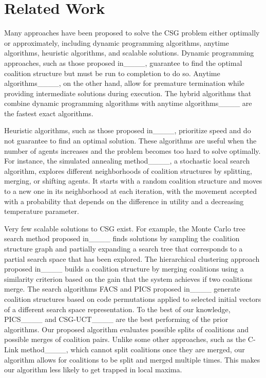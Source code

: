 \section{Related Work}
Many approaches have been proposed to solve the CSG problem either optimally or approximately, including dynamic programming algorithms, anytime algorithms, heuristic algorithms, and scalable solutions. 
Dynamic programming approaches, such as those proposed in____, guarantee to find the optimal coalition structure but must be run to completion to do so. 
Anytime algorithms____, on the other hand, allow for premature termination while providing intermediate solutions during execution. 
The hybrid algorithms that combine dynamic programming algorithms with anytime algorithms____  are the fastest exact algorithms. 

Heuristic algorithms, such as those proposed in____, prioritize speed and do not guarantee to find an optimal solution. These algorithms are useful when the number of agents increases and the problem becomes too hard to solve optimally. For instance, the simulated annealing method____, a stochastic local search algorithm, explores different neighborhoods of coalition structures by splitting, merging, or shifting agents. It starts with a random coalition structure and moves to a new one in its neighborhood at each iteration, with the movement accepted with a probability that depends on the difference in utility and a decreasing temperature parameter. 

Very few scalable solutions to CSG exist. For example, the Monte Carlo tree search method proposed in____ finds solutions by sampling the coalition structure graph and partially expanding a search tree that corresponds to a partial search space that has been explored. The hierarchical clustering approach proposed in____ builds a coalition structure by merging coalitions using a similarity criterion based on the gain that the system achieves if two coalitions merge. The search algorithms FACS and PICS proposed in____ %
generate coalition structures based on code permutations applied to selected initial vectors of a different search space representation. To the best of our knowledge, PICS____ and CSG-UCT____ are the best performing of the prior algorithms. 
Our proposed algorithm evaluates possible splits of coalitions and possible merges of coalition pairs. Unlike some other approaches, such as the C-Link method____, which cannot split coalitions once they are merged, our algorithm allows for coalitions to be split and merged multiple times. This makes our algorithm less likely to get trapped in local maxima. 

